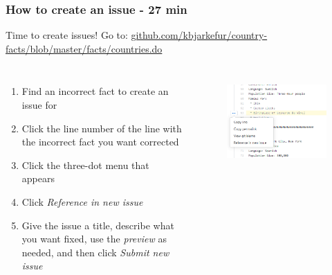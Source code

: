 \documentclass[aspectratio=169]{beamer} %
\newcommand{\trainingURL}[1]{{\color{blue}\url{#1}}}
\newcommand{\traininerUsername}{kbjarkefur}
\newcommand{\repoName}{\traininerUsername/country-facts}
\newcommand{\trainingRepoURL}[1]{\trainingURL{github.com/\repoName #1}}
\begin{document}
\begin{frame}
	\frametitle{How to create an issue - 27 min}

	Time to create issues! Go to: \trainingRepoURL{/blob/master/facts/countries.do}
	\vspace{.5cm}

	\begin{columns}[c]

		\begin{enumerate}
			\item Find an incorrect fact to create an issue for
			\item Click the line number of the line with the incorrect fact you want corrected
			\item Click the three-dot menu that appears
			\item Click \textit{Reference in new issue}
			\item Give the issue a title, describe what you want fixed, use the \textit{preview} as needed, and then click \textit{Submit new issue}
		\end{enumerate}

		\begin{figure}
			\centering
			\includegraphics[width=1\linewidth]{img/reference-code-line-issue.png}
			\label{fig:branches}
		\end{figure}
	\end{columns}
\end{frame}
\end{document}
